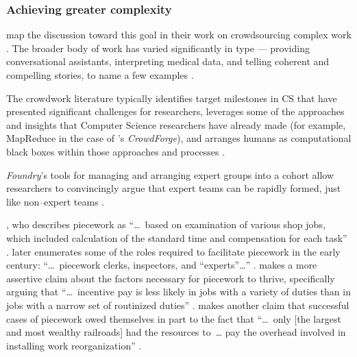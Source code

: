 \documentclass[trackingWork]{subfiles}
\begin{document}
\subsubsection{Achieving greater complexity
}\label{sec:Complexity}

\citeauthor{crowdForgeKittur}
map the discussion toward this goal in their work on
crowdsourcing complex work
\cite{crowdForgeKittur}.
The broader body of work has varied significantly in type
--- providing conversational assistants,
interpreting medical data, and
telling coherent and compelling stories,
to name a few examples
\cite{Lasecki:2013:CCC:2501988.2502057,mavandadi2012distributed,KimStoria}.

The crowdwork literature typically identifies target milestones in CS
that have presented significant challenges for researchers,
leverages some of the approaches and insights that Computer Science researchers have already made
(for example, MapReduce in the case of \citeauthor{crowdForgeKittur}'s \textit{CrowdForge}),
and arranges humans as computational black boxes within those approaches and processes
\cite[][and others]{crowdForgeKittur,foundry}.

\textit{Foundry}'s tools for managing and arranging expert groups into a cohort
allow researchers to convincingly argue that expert teams can be rapidly formed,
just like non--expert teams
\cite{foundry}.




\citeauthor{10.2307/23702539},
who describes piecework as
    ``\dots~based on examination of various shop jobs,
    which included calculation of the standard time and compensation for each task''
\cite{10.2307/23702539}.
\citeauthor{10.2307/23702539} later enumerates some of the roles required
to facilitate piecework in the early  century:
    ``\dots~piecework clerks, inspectors, and ``experts''\dots''
\cite{10.2307/23702539}.
\citeauthor{Brown01041990} makes a more assertive
claim about the factors necessary for piecework to thrive,
specifically arguing that
    ``\dots~incentive pay is less likely in jobs with
    a variety of duties than in jobs with a narrow set of routinized duties''
\cite{Brown01041990}.
\citeauthor{10.2307/23702539} makes another claim that
successful cases of piecework owed themselves in part to the fact that
    ``\dots~only [the largest and most wealthy railroads] had the resources to~\dots
    pay the overhead involved in installing work reorganization''
\cite{10.2307/23702539}.
\end{document}
